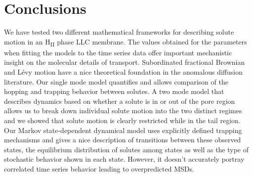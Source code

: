 \documentclass{article}
\begin{document}
  
%  
  

  \section{Conclusions}
  
  
  We have tested two different mathematical frameworks for describing solute
  motion in an H\textsubscript{II} phase LLC membrane. The values obtained for
  the parameters when fitting the models to the time series data offer important
  mechanistic insight on the molecular details of transport.
  Subordinated fractional Brownian and L\'evy motion have a nice theoretical 
  foundation in the anomalous diffusion literature. Our single mode model
  quantifies and allows comparison of the hopping and trapping behavior 
  between solutes. A two mode model that describes dynamics based on whether
  a solute is in or out of the pore region allows us to break down individual
  solute motion into the two distinct regimes and we showed that solute motion is
  clearly restricted while in the tail region. Our Markov state-dependent dynamical
  model uses explicitly defined trapping mechanisms and gives a nice description 
  of transitions between these observed states, the equilibrium distribution of 
  solutes among states as well as the type of stochastic behavior shown in each 
  state. However, it doesn't accurately portray correlated time series behavior
  leading to overpredicted MSDs.
  
\end{document}
